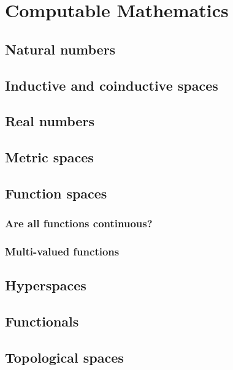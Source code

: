 \chapter{Computable Mathematics}
\label{chap:computable-mathematics}

\section{Natural numbers}
\label{sec:natural-numbers}



\section{Inductive and coinductive spaces}
\label{sec:inductive-coinductive}


\section{Real numbers}
\label{sec:real-numbers}

\section{Metric spaces}
\label{sec:metric-spaces}


\section{Function spaces}
\label{sec:function-spaces}

\subsection{Are all functions continuous?}
\label{sec:all-fun-cont}

\subsection{Multi-valued functions}
\label{sec:multi-valued-functions}



\section{Hyperspaces}
\label{sec:hyperspaces}


\section{Functionals}
\label{sec:functionals}


\section{Topological spaces}
\label{sec:topological-spaces}



